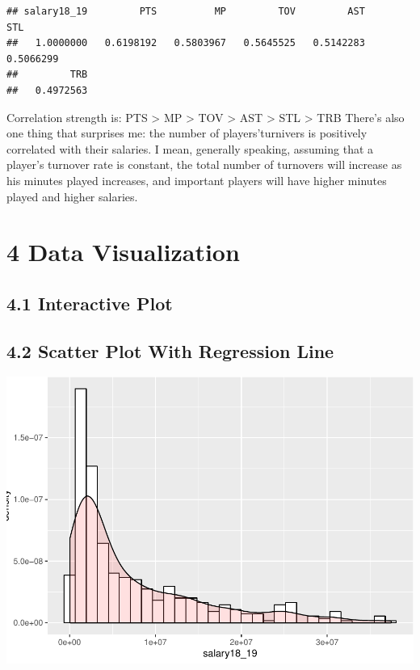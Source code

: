 \documentclass[]{article}
\begin{document}
\begin{verbatim}
## salary18_19         PTS          MP         TOV         AST         STL 
##   1.0000000   0.6198192   0.5803967   0.5645525   0.5142283   0.5066299 
##         TRB 
##   0.4972563
\end{verbatim}

Correlation strength is: PTS \textgreater{} MP \textgreater{} TOV
\textgreater{} AST \textgreater{} STL \textgreater{} TRB There's also
one thing that surprises me: the number of players'turnivers is
positively correlated with their salaries. I mean, generally speaking,
assuming that a player's turnover rate is constant, the total number of
turnovers will increase as his minutes played increases, and important
players will have higher minutes played and higher salaries.

\section{4 Data Visualization}\label{data-visualization}

\subsection{4.1 Interactive Plot}\label{interactive-plot}

\subsection{4.2 Scatter Plot With Regression
Line}\label{scatter-plot-with-regression-line}

\includegraphics{Final_Report_files/figure-latex/unnamed-chunk-13-1.pdf}
\end{document}
